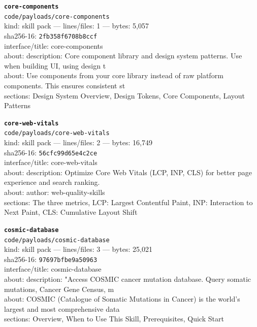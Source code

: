 \noindent\textbf{\texttt{core-components}}\\
\texttt{code/payloads/core-components}\\
kind: skill pack --- lines/files: 1 --- bytes: 5,057\\
sha256-16: \texttt{2fb358f6708b8ccf}\\
interface/title: core-components\\
about: description: Core component library and design system patterns. Use when building UI, using design t\\
about: Use components from your core library instead of raw platform components. This ensures consistent st\\
sections: Design System Overview, Design Tokens, Core Components, Layout Patterns\\
\vspace*{6.0pt}
\newpage

\noindent\textbf{\texttt{core-web-vitals}}\\
\texttt{code/payloads/core-web-vitals}\\
kind: skill pack --- lines/files: 2 --- bytes: 16,749\\
sha256-16: \texttt{56cfc99d65e4c2ce}\\
interface/title: core-web-vitals\\
about: description: Optimize Core Web Vitals (LCP, INP, CLS) for better page experience and search ranking.\\
about: author: web-quality-skills\\
sections: The three metrics, LCP: Largest Contentful Paint, INP: Interaction to Next Paint, CLS: Cumulative Layout Shift\\
\vspace*{6.0pt}

\noindent\textbf{\texttt{cosmic-database}}\\
\texttt{code/payloads/cosmic-database}\\
kind: skill pack --- lines/files: 3 --- bytes: 25,021\\
sha256-16: \texttt{97697bfbe9a50963}\\
interface/title: cosmic-database\\
about: description: "Access COSMIC cancer mutation database. Query somatic mutations, Cancer Gene Census, m\\
about: COSMIC (Catalogue of Somatic Mutations in Cancer) is the world's largest and most comprehensive data\\
sections: Overview, When to Use This Skill, Prerequisites, Quick Start\\
\vspace*{6.0pt}

